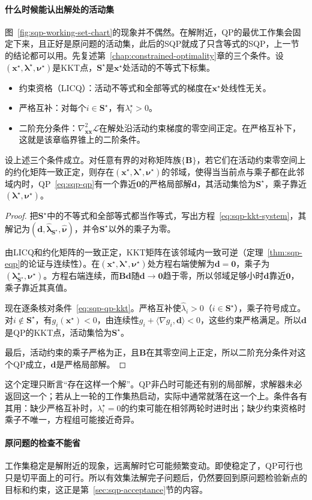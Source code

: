 \paragraph{什么时候能认出解处的活动集}
图~\ref{fig:sqp-working-set-chart}的现象并不偶然。在解附近，QP的最优工作集会固定下来，且正好是原问题的活动集，此后的SQP就成了只含等式的SQP，上一节的结论都可以用。先复述第~\ref{chap:constrained-optimality}章的三个条件。设$(\bm{x}^\star,\bm{\lambda}^\star,\bm{\nu}^\star)$是KKT点，$\bm{S}^\star$是$\bm{x}^\star$处活动的不等式下标集。

\begin{itemize}
 \item 约束资格（LICQ）：活动不等式和全部等式的梯度在$\bm{x}^\star$处线性无关。
 \item 严格互补：对每个$i\in\bm{S}^\star$，有$\lambda_i^\star>0$。
 \item 二阶充分条件：$\nabla^2_{\bm{x}\bm{x}}\mathcal{L}$在解处沿活动约束梯度的零空间正定。在严格互补下，这就是该章临界锥上的二阶条件。
\end{itemize}

\begin{theorem}[解附近的活动集识别]
\label{thm:sqp-identification}
设上述三个条件成立。对任意有界的对称矩阵族$\{\bm{B}\}$，若它们在活动约束零空间上的约化矩阵一致正定，则存在$(\bm{x}^\star,\bm{\lambda}^\star,\bm{\nu}^\star)$的邻域，使得当当前点与乘子都在此邻域内时，QP~\eqref{eq:sqp-qp}有一个靠近$\bm{0}$的严格局部解$\bm{d}$，其活动集恰为$\bm{S}^\star$，乘子靠近$(\bm{\lambda}^\star,\bm{\nu}^\star)$。
\end{theorem}

\begin{proof}
把$\bm{S}^\star$中的不等式和全部等式都当作等式，写出方程~\eqref{eq:sqp-kkt-system}，其解记为$(\bm{d},\hat{\bm{\lambda}}_{\bm{S}^\star},\hat{\bm{\nu}})$，并令$\bm{S}^\star$以外的乘子为零。

由LICQ和约化矩阵的一致正定，KKT矩阵在该邻域内一致可逆（定理~\ref{thm:sqp-eqp}的论证与连续性）。在$(\bm{x}^\star,\bm{\lambda}^\star,\bm{\nu}^\star)$处方程右端使解为$\bm{d}=\bm{0}$，乘子为$(\bm{\lambda}^\star_{\bm{S}^\star},\bm{\nu}^\star)$。方程右端连续，而$\bm{B}\bm{d}$随$\bm{d}\to\bm{0}$趋于零，所以邻域足够小时$\bm{d}$靠近$\bm{0}$，乘子靠近其真值。

现在逐条核对条件~\eqref{eq:sqp-qp-kkt}。严格互补使$\hat\lambda_i>0$（$i\in\bm{S}^\star$），乘子符号成立。对$i\notin\bm{S}^\star$，有$g_i(\bm{x}^\star)<0$，由连续性$g_i+\langle\nabla g_i,\bm{d}\rangle<0$，这些约束严格满足。所以$\bm{d}$是QP的KKT点，活动集恰为$\bm{S}^\star$。

最后，活动约束的乘子严格为正，且$\bm{B}$在其零空间上正定，所以二阶充分条件对这个QP成立，$\bm{d}$是严格局部解。
\end{proof}

这个定理只断言“存在这样一个解”。QP非凸时可能还有别的局部解，求解器未必返回这一个；若从上一轮的工作集热启动，实际中通常就落在这一个上。条件各有其用：缺少严格互补时，$\lambda_i^\star=0$的约束可能在相邻两轮时进时出；缺少约束资格时乘子不唯一，方程组可能接近奇异。

\paragraph{原问题的检查不能省}
工作集稳定是解附近的现象，远离解时它可能频繁变动。即使稳定了，QP可行也只是切平面上的可行。所以有效集法解完子问题后，仍然要回到原问题检验新点的目标和约束，这正是第~\ref{sec:sqp-acceptance}节的内容。
